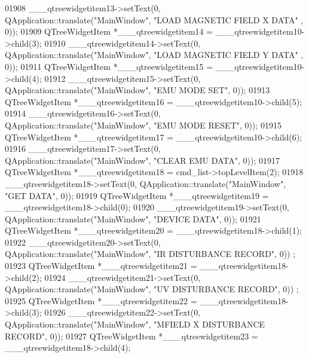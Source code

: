 \begin{DoxyCode}
01908         \_\_\_qtreewidgetitem13->setText(0, QApplication::translate(\textcolor{stringliteral}{"MainWindow"}, \textcolor{stringliteral}{"LOAD MAGNETIC FIELD X DATA"}
      , 0));
01909         QTreeWidgetItem *\_\_\_qtreewidgetitem14 = \_\_\_qtreewidgetitem10->child(3);
01910         \_\_\_qtreewidgetitem14->setText(0, QApplication::translate(\textcolor{stringliteral}{"MainWindow"}, \textcolor{stringliteral}{"LOAD MAGNETIC FIELD Y DATA"}
      , 0));
01911         QTreeWidgetItem *\_\_\_qtreewidgetitem15 = \_\_\_qtreewidgetitem10->child(4);
01912         \_\_\_qtreewidgetitem15->setText(0, QApplication::translate(\textcolor{stringliteral}{"MainWindow"}, \textcolor{stringliteral}{"EMU MODE SET"}, 0));
01913         QTreeWidgetItem *\_\_\_qtreewidgetitem16 = \_\_\_qtreewidgetitem10->child(5);
01914         \_\_\_qtreewidgetitem16->setText(0, QApplication::translate(\textcolor{stringliteral}{"MainWindow"}, \textcolor{stringliteral}{"EMU MODE RESET"}, 0));
01915         QTreeWidgetItem *\_\_\_qtreewidgetitem17 = \_\_\_qtreewidgetitem10->child(6);
01916         \_\_\_qtreewidgetitem17->setText(0, QApplication::translate(\textcolor{stringliteral}{"MainWindow"}, \textcolor{stringliteral}{"CLEAR EMU DATA"}, 0));
01917         QTreeWidgetItem *\_\_\_qtreewidgetitem18 = cmd\_list->topLevelItem(2);
01918         \_\_\_qtreewidgetitem18->setText(0, QApplication::translate(\textcolor{stringliteral}{"MainWindow"}, \textcolor{stringliteral}{"GET DATA"}, 0));
01919         QTreeWidgetItem *\_\_\_qtreewidgetitem19 = \_\_\_qtreewidgetitem18->child(0);
01920         \_\_\_qtreewidgetitem19->setText(0, QApplication::translate(\textcolor{stringliteral}{"MainWindow"}, \textcolor{stringliteral}{"DEVICE DATA"}, 0));
01921         QTreeWidgetItem *\_\_\_qtreewidgetitem20 = \_\_\_qtreewidgetitem18->child(1);
01922         \_\_\_qtreewidgetitem20->setText(0, QApplication::translate(\textcolor{stringliteral}{"MainWindow"}, \textcolor{stringliteral}{"IR DISTURBANCE RECORD"}, 0))
      ;
01923         QTreeWidgetItem *\_\_\_qtreewidgetitem21 = \_\_\_qtreewidgetitem18->child(2);
01924         \_\_\_qtreewidgetitem21->setText(0, QApplication::translate(\textcolor{stringliteral}{"MainWindow"}, \textcolor{stringliteral}{"UV DISTURBANCE RECORD"}, 0))
      ;
01925         QTreeWidgetItem *\_\_\_qtreewidgetitem22 = \_\_\_qtreewidgetitem18->child(3);
01926         \_\_\_qtreewidgetitem22->setText(0, QApplication::translate(\textcolor{stringliteral}{"MainWindow"}, \textcolor{stringliteral}{"MFIELD X  DISTURBANCE
       RECORD"}, 0));
01927         QTreeWidgetItem *\_\_\_qtreewidgetitem23 = \_\_\_qtreewidgetitem18->child(4);

\end{DoxyCode}
